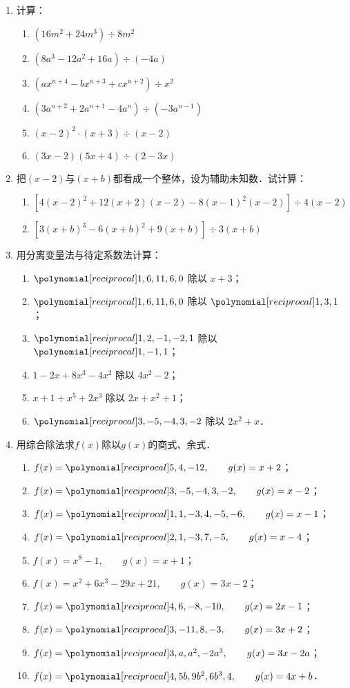 \begin{enumerate}
    \item 计算：
\begin{enumerate}
    \item $(16m^2+24m^3)\div 8m^2$
    \item $(8a^3-12a^2+16a)\div (-4a)$
    \item $(ax^{n+4}-bx^{n+3}+cx^{n+2})\div x^2$
    \item $(3a^{n+2}+2a^{n+1}-4a^n)\div (-3a^{n-1})$
\item $(x-2)^2 \cdot (x+3)\div (x-2)$
\item $(3x-2)(5x+4)\div (2-3x)$
\end{enumerate}

\item 把$(x-2)$与$(x+b)$都看成一个整体，设为辅助未知数．试计算：
\begin{enumerate}
    \item $\left[4(x-2)^2+12(x+2)(x-2)-8(x-1)^2(x-2)\right]\div 4(x-2)$
    \item $\left[3(x+b)^3-6(x+b)^2+9(x+b)\right]\div 3(x+b)$
\end{enumerate}

\item 用分离变量法与待定系数法计算：

\begin{enumerate}
    \item $\poly{1,6,11,6,0}$ 除以 $x+3$；
    \item $\poly{1,6,11,6,0}$ 除以 $\poly{1,3,1}$；
    \item $\poly{1,2,-1,-2,1}$ 除以 $\poly{1,-1,1}$；
    \item $1-2x+8x^3-4x^2$ 除以 $4x^2-2$；
    \item $x+1+x^5+2x^3$ 除以 $2x+x^2+1$；
    \item $\poly{3,-5,-4,3,-2}$ 除以 $2x^2+x$．
\end{enumerate}

\item 用综合除法求$f(x)$除以$g(x)$的商式、余式．

\begin{enumerate}
    \item $f(x)=\poly{5,4,-12},\qquad g(x)=x+2$；
    \item $f(x)=\poly{3,-5,-4,3,-2},\qquad g(x)=x-2$；
    \item $f(x)=\poly{1,1,-3,4,-5,-6},\qquad g(x)=x-1$；
    \item $f(x)=\poly{2,1,-3,7,-5},\qquad g(x)=x-4$；
    \item $f(x)=x^8-1,\qquad g(x)=x+1$；
    \item $f(x)=x^2+6x^3-29x+21,\qquad g(x)=3x-2$；
    \item $f(x)=\poly{4,6,-8,-10},\qquad g(x)=2x-1$；
    \item $f(x)=\poly{3,-11,8,-3},\qquad g(x)=3x+2$；
    \item $f(x)=\poly{3,a,a^2,-2a^3},\qquad g(x)=3x-2a$；
    \item $f(x)=\poly{4,5b,9b^2,6b^3,4},\qquad g(x)=4x+b$．
\end{enumerate}


\end{enumerate}
